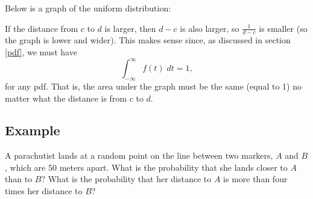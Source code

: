 \noindent Below is a graph of the uniform distribution:
\begin{center}
\end{center}
If the distance from $c$ to $d$ is larger, then $d-c$ is also larger, so $\frac{1}{d-c}$ is smaller (so the graph is lower and wider). This makes sense since, as discussed in section \ref{pdf}, we must have
\[
\int_{-\infty}^\infty f(t) \; dt = 1,
\]
for any pdf. That is, the area under the graph must be the same (equal to 1) no matter what the distance is from $c$ to $d$.


\subsection{Example}
A parachutist lands at a random point on the line between two markers, $A$ and $B$, which are 50 meters apart. What is the probability that she lands closer to $A$ than to $B$? What is the probability that her distance to $A$ is more than four times her distance to $B$? \\

